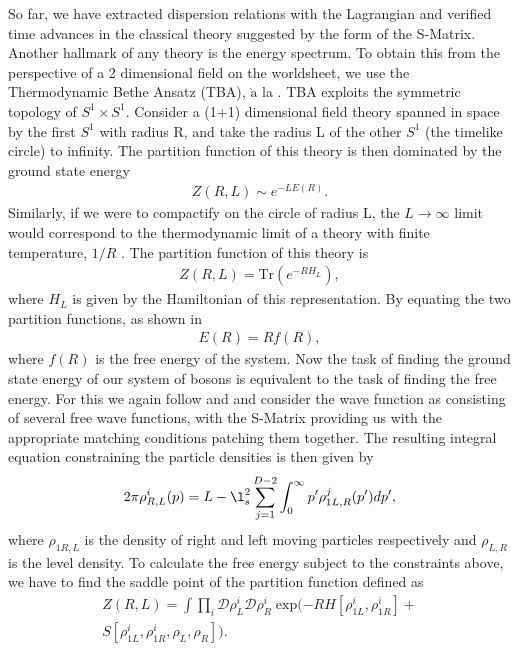 \documentclass[%
 reprint,
 amsmath,amssymb,
 aps,
]{revtex4-1}
\begin{document}
So far, we have extracted dispersion relations with the Lagrangian and verified time advances in the
classical theory suggested by the form of the S-Matrix. Another hallmark of any theory is the energy
spectrum. To obtain this from the perspective of a 2 dimensional field on the
worldsheet, we use the Thermodynamic Bethe Ansatz (TBA), $\mathrm{\grave{a}}$ la \cite{Dubovsky:2012wk}.  TBA
exploits the symmetric topology of $S^1 \times S^1$. Consider a (1+1) dimensional field theory spanned in space by the first
$S^1$ with radius R, and take the radius L of the other $S^1$ (the timelike circle) to infinity. The partition function of
this theory is then dominated by the ground state energy
\begin{eqnarray}
    Z(R,L) \sim e^{-L E(R)} \nonumber .
\end{eqnarray}
Similarly, if we were to compactify on the circle of radius L, the $L \rightarrow \infty$ limit
would correspond to the thermodynamic limit of a theory with finite temperature, $1/R$ .  The
partition function of this theory is
\begin{eqnarray}
    Z(R,L) = \mathrm{Tr} \left( e^{-R H_L} \right) \nonumber ,
\end{eqnarray}
where $H_L$ is given by the Hamiltonian of this representation. By equating the two partition
functions, as shown in \cite{Zamolodchikov:1989cf}
\begin{eqnarray}
    E(R) = R f(R) \nonumber ,
\end{eqnarray}
where $f(R)$ is the free energy of the system.  Now the task of finding the ground state energy of
our system of bosons is equivalent to the task of finding the free energy. For this we again follow
\cite{Zamolodchikov:1989cf} and \cite{Dubovsky:2012wk} and consider the wave function as consisting
of several free wave functions, with the S-Matrix providing us with the appropriate matching conditions patching
them together.  The resulting integral equation constraining the particle densities is then given by
\begin{eqnarray}
    2 \pi \rho_{R,L}^i(p) = L - \l_s^2 \sum_{j=1}^{D-2} \int_0^{\infty} p' \rho_{1L,R}^j (p') dp' ,
\end{eqnarray}
where $\rho_{1R,L}$ is the density of right and left moving particles respectively and $\rho_{L,R}$ is
the level density. To calculate the free energy subject to the constraints above, we have to
find the saddle point of the partition function defined as
\begin{eqnarray}
    Z(R,L) = \int \prod_i \mathcal{D} \rho^i_L \mathcal{D} \rho^i_R \; \mathrm{exp}(- R H[\rho^i_{1L},
    \rho^i_{1R}] + \nonumber \\
    S[\rho^i_{1L}, \rho^i_{1R},\rho_L,\rho_R] ) \nonumber .
\end{eqnarray}
\end{document}
